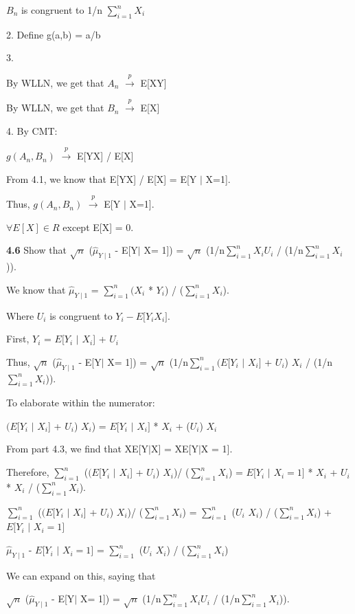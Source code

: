 $B_{n}$ is congruent to 1/n $\sum^n_{i=1} X_{i}$

2. Define g(a,b) = a/b

3. 

By WLLN, we get that $A_{n}$ $\xrightarrow{p}$ E[XY]

By WLLN, we get that $B_{n}$ $\xrightarrow{p}$ E[X]

4. By CMT:

$g(A_{n}, B_{n})$ $\xrightarrow{p}$ E[YX] / E[X] 

From 4.1, we know that E[YX] / E[X] = E[Y $\mid$ X=1].

Thus, $g(A_{n}, B_{n})$ $\xrightarrow{p}$ E[Y $\mid$ X=1].

$\forall E[X] \in R$ except E[X] = 0.

\textbf{4.6} Show that $\sqrt{n}$ ($\hat{\mu}_{Y\mid1}$ - E[Y$\mid$ X= 1]) = $\sqrt{n}$ (1/n$\sum^n_{i=1} X_{i}U_{i}$ / (1/n$\sum^n_{i=1} X_{i}$)).

We know that 
$\hat{\mu}_{Y\mid1}$ = $\sum^n_{i=1} (X_{i}$ * $Y_{i}$) / ($\sum^n_{i=1} X_{i}$).

Where $U_{i}$ is congruent to $Y_{i} - E[Y_{i} $\mid$ X_{i}]$.

First, 
$Y_{i}$ = $E[Y_{i}$ $\mid$ $X_{i}$] + $U_{i}$

Thus,
$\sqrt{n}$ ($\hat{\mu}_{Y\mid1}$ - E[Y$\mid$ X= 1]) = $\sqrt{n}$ (1/n$\sum^n_{i=1} (E[Y_{i} $ $\mid$ $X_{i}]$ + $U_{i}$) $X_{i}$ / (1/n$\sum^n_{i=1} X_{i}$)).

To elaborate within the numerator:

$(E[Y_{i}$ $\mid$ $X_{i}$] + $U_{i}$) $X_{i}$) =  $E[Y_{i} $ $\mid$ $X_{i}]$ * $X_{i}$ + ($U_{i}$) $X_{i}$ 

From part 4.3, we find that XE[Y$\mid$X] = XE[Y$\mid$X = 1].

Therefore, $\sum^n_{i=1}$ ($(E[Y_{i}$ $\mid$ $X_{i}$] + $U_{i}$) $X_{i}$)/ ($\sum^n_{i=1} X_{i}$) =  $E[Y_{i}$ $\mid$ $X_{i} = 1]$ * $X_{i}$ + $U_{i}$ * $X_{i}$ / ($\sum^n_{i=1} X_{i}$). 

$\sum^n_{i=1}$ ($(E[Y_{i}$ $\mid$ $X_{i}$] + $U_{i}$) $X_{i}$)/ ($\sum^n_{i=1} X_{i}$) = $\sum^n_{i=1}$ ($U_{i}$ $X_{i}$) / ($\sum^n_{i=1} X_{i}$) + $E[Y_{i}$ $\mid$ $X_{i} = 1]$  

$\hat{\mu}_{Y\mid1}$ - $E[Y_{i}$ $\mid$ $X_{i} = 1]$ = $\sum^n_{i=1}$ ($U_{i}$ $X_{i}$) / ($\sum^n_{i=1} X_{i}$)

We can expand on this, saying that 

$\sqrt{n}$ ($\hat{\mu}_{Y\mid1}$ - E[Y$\mid$ X= 1]) = $\sqrt{n}$ (1/n$\sum^n_{i=1} X_{i}U_{i}$ / (1/n$\sum^n_{i=1} X_{i}$)).

